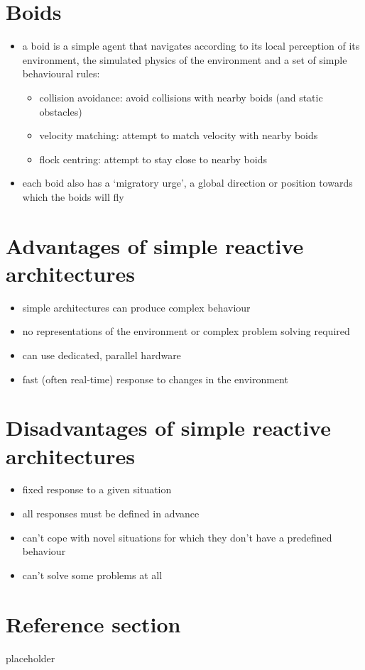 \documentclass{article}
\begin{document}
\section{Boids}
\begin{itemize}
  \item a boid is a simple agent that navigates according to its local perception of its environment, the simulated physics of the environment and a set of simple behavioural rules:
  \begin{itemize}
     \item collision avoidance: avoid collisions with nearby boids (and static obstacles)
     \item velocity matching: attempt to match velocity with nearby boids 
     \item flock centring: attempt to stay close to nearby boids
   \end{itemize} 
  \item each boid also has a ‘migratory urge’, a global direction or position towards which the boids will fly
\end{itemize}

\section{Advantages of simple reactive architectures}
\begin{itemize}
  \item simple architectures can produce complex behaviour 
  \item no representations of the environment or complex problem solving required 
  \item can use dedicated, parallel hardware 
  \item fast (often real-time) response to changes in the environment
\end{itemize}

\section{Disadvantages of simple reactive architectures}
\begin{itemize}
  \item fixed response to a given situation 
  \item all responses must be defined in advance 
  \item can’t cope with novel situations for which they don’t have a predefined behaviour 
  \item can’t solve some problems at all
\end{itemize}


\pagebreak
\section*{Reference section} \label{sec:reference}
\begin{description}
	\item[placeholder] \hfill \\
\end{description}
\end{document}
